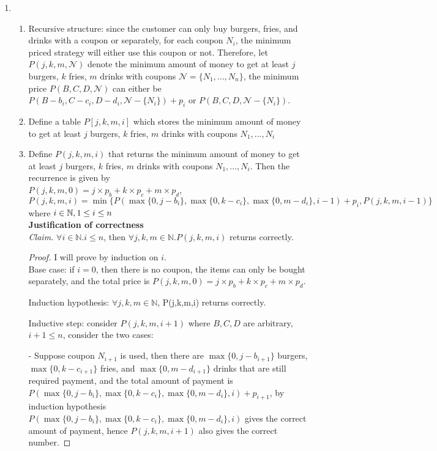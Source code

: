 \documentclass[11pt]{article}
\begin{document}
\begin{enumerate}
    \newpage
    \item
    \begin{enumerate}
        \item Recursive structure: since the customer can only buy burgers, fries, and drinks with a coupon or separately, for each coupon $N_i$, the minimum priced strategy will either use this coupon or not. Therefore, let $P(j,k,m,\mathcal{N})$ denote the minimum amount of money to get at least $j$ burgers, $k$ fries, $m$ drinks with coupons $\mathcal{N}=\{N_1,...,N_n\}$, the minimum price $P(B,C,D,\mathcal{N})$ can either be $P(B-b_i,C-c_i,D-d_i, \mathcal{N}-\{N_i\}) + p_i$ or $P(B,C,D, \mathcal{N}-\{N_i\})$. 
        \item Define a table $P[j,k,m,i]$ which stores the minimum amount of money to get at least $j$ burgers, $k$ fries, $m$ drinks with coupons $N_1,...,N_i$
        \item Define $P(j,k,m,i)$ that returns the minimum amount of money to get at least $j$ burgers, $k$ fries, $m$ drinks with coupons $N_1,...,N_i$. Then the recurrence is given by \\
        $P(j,k,m,0) = j\times p_b + k\times p_c + m\times p_d$, \\
        $P(j,k,m,i) = \min\{P(\max\{0, j-b_i\}, \max\{0,k-c_i\}, \max\{0,m-d_i\}, i-1) + p_i, P(j,k,m,i-1)\}$ where $i \in \mathbb N, 1\leq i \leq n$ \\
        
      
        \textbf{Justification of correctness}\\ 
        \textit{Claim. } $\forall i\in\mathbb{N}. i\leq n$, then $\forall j,k,m\in\mathbb{N}. P(j,k,m,i)$ returns correctly.
        \begin{proof} I will prove by induction on $i$.\\
        Base case: if $i=0$, then there is no coupon, the items can only be bought separately, and the total price is $P(j,k,m,0) = j\times p_b + k\times p_c + m\times p_d$. 
        
        Induction hypothesis: $\forall j,k,m\in\mathbb{N}$, P(j,k,m,i) returns correctly. 
        
        Inductive step: consider $P(j,k,m,i+1)$ where $B,C,D$ are arbitrary, $i+1\leq n$, consider the two cases:
        
        - Suppose coupon $N_{i+1}$ is used, then there are $\max\{0, j-b_{i+1}\}$ burgers, $\max\{0, k-c_{i+1}\}$ fries, and $\max\{0, m-d_{i+1}\}$ drinks that are still required payment, and the total amount of payment is $P(\max\{0, j-b_i\}, \max\{0,k-c_i\}, \max\{0,m-d_i\}, i) + p_{i+1}$, by induction hypothesis $P(\max\{0, j-b_i\}, \max\{0,k-c_i\}, \max\{0,m-d_i\}, i)$ gives the correct amount of payment, hence $P(j,k,m,i+1)$ also gives the correct number. 
        

\end{proof}
\end{enumerate}
\end{enumerate}
\end{document}
